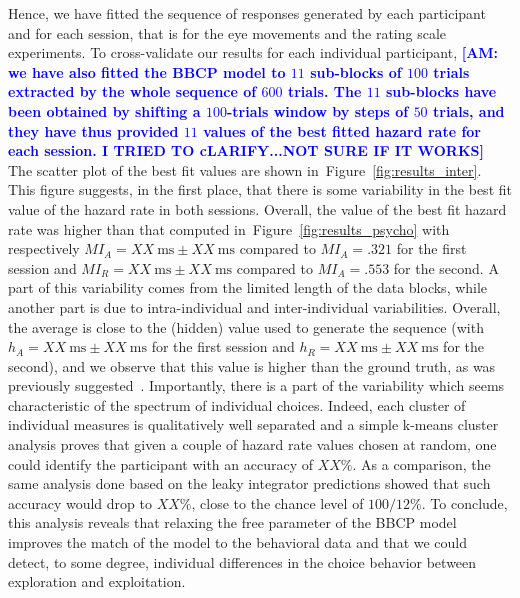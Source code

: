 \documentclass[12pt,english]{article}%
\newcommand{\ms}{\si{\milli\second}}%
\newcommand{\citep}[1]{\parencite{#1}}
\newcommand{\seeFig}[1]{Figure~\ref{fig:#1}}
\newcommand{\AM}[1]{\textbf{\textcolor{blue}{[AM: #1]}}}
\begin{document}
Hence, we have fitted the sequence of responses generated by each participant and
for each session, that is for the eye movements and the rating scale experiments.
To cross-validate our results for each individual participant,
\AM{we have also fitted the BBCP model to $11$ sub-blocks of $100$ trials extracted by the whole sequence of $600$ trials. The $11$ sub-blocks have been obtained by shifting a $100$-trials window by steps of $50$ trials, and they have thus provided $11$ values of the best fitted hazard rate for each session. I TRIED TO cLARIFY...NOT SURE IF IT WORKS}
The scatter plot of the best fit values are shown in~\seeFig{results_inter}.
This figure suggests, in the first place, that there is some variability
in the best fit value of the hazard rate in both sessions.
Overall, the value of the best fit hazard rate
was higher than that computed in~\seeFig{results_psycho}
with respectively $MI_A = XX~\ms \pm XX~\ms$ compared to $MI_A = .321$ for the first session and
$MI_R = XX~\ms \pm XX~\ms$ compared to $MI_A = .553$ for the second.
A part of this variability comes from the limited length of the data blocks,
while another part is due to intra-individual and inter-individual variabilities.
Overall, the average is close to the (hidden) value used to generate the sequence
(with $h_A = XX~\ms \pm XX~\ms$ for the first session and
$h_R = XX~\ms \pm XX~\ms$ for the second),
and we observe that this value is higher than the ground truth,
as was previously suggested~\citep{Meyniel??}.
Importantly, there is a part of the variability
which seems characteristic of the spectrum of individual choices.
Indeed, each cluster of individual measures is qualitatively well separated and
a simple k-means cluster analysis proves that
given a couple of hazard rate values chosen at random,
one could identify the participant with an accuracy of $XX\%$.
As a comparison, the same analysis done based on the leaky integrator predictions
showed that such accuracy would drop to $XX\%$,
close to the chance level of $100/12\%$.
To conclude, this analysis reveals
that relaxing the free parameter of the BBCP model
improves the match of the model to the behavioral data and
that we could detect, to some degree, individual differences in the choice behavior
between exploration and exploitation.
\end{document}
